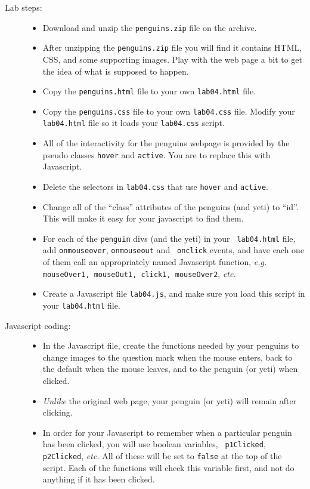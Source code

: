 \documentclass{article}
\begin{document}
\begin{description}
\item[Lab steps:]\mbox{}
  \begin{itemize}
  \item Download and unzip the {\tt penguins.zip} file on the archive.
    \item
  After unzipping the {\tt penguins.zip} file you will find it
  contains HTML, CSS, and some supporting images.  Play with the web
  page a bit to get the idea of what is supposed to happen.
\item
  Copy the {\tt penguins.html} file to your own {\tt lab04.html} file.
\item
  Copy the {\tt penguins.css} file to your own {\tt lab04.css} file.
  Modify your {\tt lab04.html} file so it loads your {\tt lab04.css}
  script. 
\item
All of the interactivity for the penguins webpage is provided by 
the pseudo classes {\tt hover} and {\tt active}.  You are to replace
this with Javascript.
\item Delete the selectors in {\tt lab04.css} that use {\tt hover} and
  {\tt active}.
\item Change all of the ``class'' attributes of the penguins (and
  yeti) to ``id''.  This will make it easy for your javascript to find
  them. 
\item For each of the {\tt penguin} divs (and the yeti) in your {\tt
  lab04.html} file, add {\tt onmouseover}, {\tt onmouseout} and {\tt
  onclick} events, and have each one of them call an appropriately
  named Javascript function, {\em e.g.} {\tt mouseOver1, mouseOut1,
    click1, mouseOver2}, {\em etc.}
\item Create a Javascript file {\tt lab04.js}, and make sure you load
  this script in your {\tt lab04.html} file.
\end{itemize}
\item[Javascript coding:]\mbox{}
\begin{itemize}

\item In the Javascript file, create the functions needed by your
    penguins to change images to the question mark when the mouse
    enters, back to the default when the mouse leaves, and to the
    penguin (or yeti) when clicked.

  \item {\em Unlike} the original web page, your penguin (or yeti)
    will remain after clicking.

  \item In order for your Javascript to remember when a particular
    penguin has been clicked, you will use boolean variables, {\tt
      p1Clicked}, {\tt p2Clicked}, {\em etc.}  All of these will be
    set to {\tt false} at the top of the script.  Each of the
    functions will check this variable first, and not do anything if
    it has been clicked.


\end{itemize}
\end{description}
\end{document}
